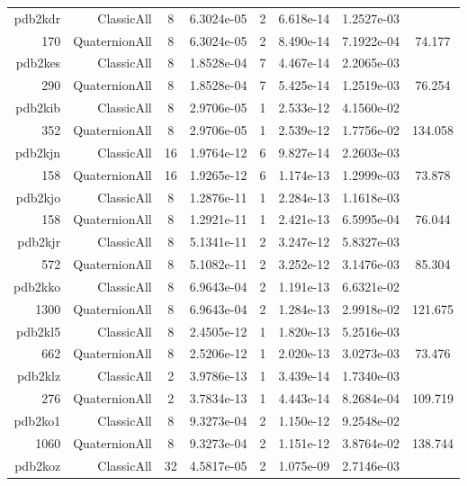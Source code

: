 \begin{xltabular}{\textwidth}{r|rcS[table-format=1.4e+2]cS[table-format=1.3e+2]S[table-format=1.4e+2]S[table-format=-1.3]}
pdb2kdr & ClassicAll & 8 & 6.3024e-05 & 2 & 6.618e-14 & 1.2527e-03 & \\
170 & QuaternionAll & 8 & 6.3024e-05 & 2 & 8.490e-14 & 7.1922e-04 & 74.177\\  \addlinespace
pdb2kes & ClassicAll & 8 & 1.8528e-04 & 7 & 4.467e-14 & 2.2065e-03 & \\
290 & QuaternionAll & 8 & 1.8528e-04 & 7 & 5.425e-14 & 1.2519e-03 & 76.254\\  \addlinespace
pdb2kib & ClassicAll & 8 & 2.9706e-05 & 1 & 2.533e-12 & 4.1560e-02 & \\
352 & QuaternionAll & 8 & 2.9706e-05 & 1 & 2.539e-12 & 1.7756e-02 & 134.058\\  \addlinespace
pdb2kjn & ClassicAll & 16 & 1.9764e-12 & 6 & 9.827e-14 & 2.2603e-03 & \\
158 & QuaternionAll & 16 & 1.9265e-12 & 6 & 1.174e-13 & 1.2999e-03 & 73.878\\  \addlinespace
pdb2kjo & ClassicAll & 8 & 1.2876e-11 & 1 & 2.284e-13 & 1.1618e-03 & \\
158 & QuaternionAll & 8 & 1.2921e-11 & 1 & 2.421e-13 & 6.5995e-04 & 76.044\\  \addlinespace
pdb2kjr & ClassicAll & 8 & 5.1341e-11 & 2 & 3.247e-12 & 5.8327e-03 & \\
572 & QuaternionAll & 8 & 5.1082e-11 & 2 & 3.252e-12 & 3.1476e-03 & 85.304\\  \addlinespace
pdb2kko & ClassicAll & 8 & 6.9643e-04 & 2 & 1.191e-13 & 6.6321e-02 & \\
1300 & QuaternionAll & 8 & 6.9643e-04 & 2 & 1.284e-13 & 2.9918e-02 & 121.675\\  \addlinespace
pdb2kl5 & ClassicAll & 8 & 2.4505e-12 & 1 & 1.820e-13 & 5.2516e-03 & \\
662 & QuaternionAll & 8 & 2.5206e-12 & 1 & 2.020e-13 & 3.0273e-03 & 73.476\\  \addlinespace
pdb2klz & ClassicAll & 2 & 3.9786e-13 & 1 & 3.439e-14 & 1.7340e-03 & \\
276 & QuaternionAll & 2 & 3.7834e-13 & 1 & 4.443e-14 & 8.2684e-04 & 109.719\\  \addlinespace
pdb2ko1 & ClassicAll & 8 & 9.3273e-04 & 2 & 1.150e-12 & 9.2548e-02 & \\
1060 & QuaternionAll & 8 & 9.3273e-04 & 2 & 1.151e-12 & 3.8764e-02 & 138.744\\  \addlinespace
pdb2koz & ClassicAll & 32 & 4.5817e-05 & 2 & 1.075e-09 & 2.7146e-03 & \\

\end{xltabular}
